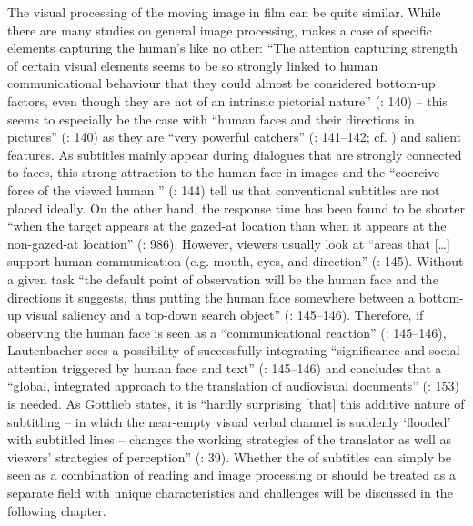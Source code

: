 The visual processing of the moving image in film can be quite similar. While there are many studies on general image processing, \citet{Lautenbacher2012} makes a case of specific elements capturing the human’s  like no other: “The attention capturing strength of certain visual elements seems to be so strongly linked to human communicational behaviour that they could almost be considered bottom-up factors, even though they are not of an intrinsic pictorial nature” (\citeyear{Lautenbacher2012}: 140) – this seems to especially be the case with “human faces and their  directions in pictures” (\citeyear{Lautenbacher2012}: 140) as they are “very powerful  catchers” (\citealt{Lautenbacher2012}: 141--142; cf. \citealt{Birmingham2008}) and salient features. As subtitles mainly appear during dialogues that are strongly connected to faces, this strong attraction to the human face in images and the “coercive force of the viewed human ” (\citealt{Lautenbacher2012}: 144) tell us that conventional subtitles are not placed ideally. On the other hand, the response time has been found to be shorter “when the target appears at the gazed-at location than when it appears at the non-gazed-at location” (\citealt{Birmingham2008}: 986). However, viewers usually look at “areas that […] support human communication (e.g. mouth, eyes, and  direction” (\citealt{Lautenbacher2012}: 145). Without a given task “the default point of observation will be the human face and the  directions it suggests, thus putting the human face somewhere between a bottom-up visual saliency and a top-down search object” (\citealt{Lautenbacher2012}: 145--146). Therefore, if observing the human face is seen as a “communicational reaction” (\citeyear{Lautenbacher2012}: 145--146), Lautenbacher sees a possibility of successfully integrating “significance and social attention triggered by human face and text” (\citeyear{Lautenbacher2012}: 145--146) and concludes that a “global, integrated approach to the translation of audiovisual documents” (\citealt{Lautenbacher2012}: 153) is needed. As Gottlieb states, it is “hardly surprising [that] this additive nature of subtitling – in which the near-empty visual verbal channel is suddenly ‘flooded’ with subtitled lines – changes the working strategies of the translator as well as viewers’ strategies of perception” (\citeyear{Gottlieb2012}: 39). Whether the  of subtitles can simply be seen as a combination of reading and image processing or should be treated as a separate field with unique characteristics and challenges will be discussed in the following chapter.

